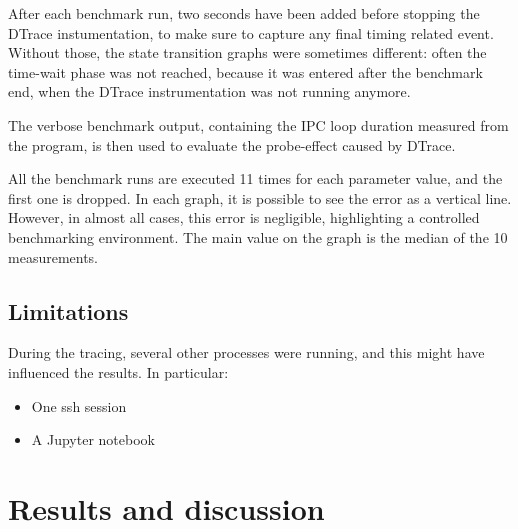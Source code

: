\documentclass[a4paper,10pt]{article}
\begin{document}
After each benchmark run, two seconds have been added before stopping the DTrace instumentation, to make sure to capture any final timing related event. Without those, the state transition graphs were sometimes different: often the time-wait phase was not reached, because it was entered after the benchmark end, when the DTrace instrumentation was not running anymore.

The verbose benchmark output, containing the IPC loop duration measured from the program, is then used to evaluate the probe-effect caused by DTrace.


All the benchmark runs are executed 11 times for each parameter value, and the first one is dropped. In each graph, it is possible to see the error as a vertical line. However, in almost all cases, this error is negligible, highlighting a controlled benchmarking environment. The main value on the graph is the median of the 10 measurements.



\subsection{Limitations}

During the tracing, several other processes were running, and this might have influenced the results. In particular:
\begin{itemize}
    \item One ssh session
    \item A Jupyter notebook
\end{itemize}


\section{Results and discussion}
\end{document}
